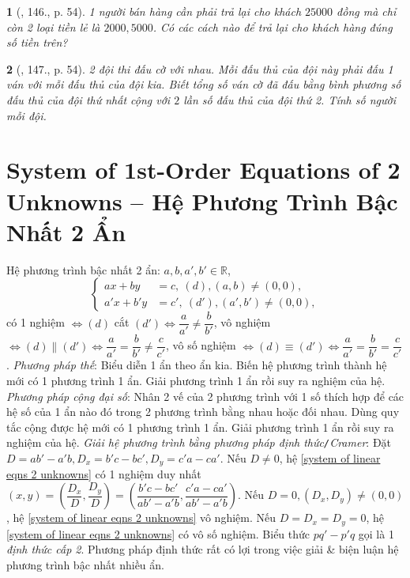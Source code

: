 \documentclass{article}
\newtheorem{baitoan}{}
\begin{document}
\begin{baitoan}[\cite{Tuyen_Toan_9_old}, 146., p. 54]
	1 người bán hàng cần phải trả lại cho khách $25000$ đồng mà chỉ còn 2 loại tiền lẻ là $2000,5000$. Có các cách nào để trả lại cho khách hàng đúng số tiền trên?
\end{baitoan}

\begin{baitoan}[\cite{Tuyen_Toan_9_old}, 147., p. 54]
	2 đội thi đấu cờ với nhau. Mỗi đấu thủ của đội này phải đấu 1 ván với mỗi đấu thủ của đội kia. Biết tổng số ván cờ đã đấu bằng bình phương số đấu thủ của đội thứ nhất cộng với $2$ lần số đấu thủ của đội thứ 2. Tính số người mỗi đội.
\end{baitoan}


\section{System of 1st-Order Equations of 2 Unknowns -- Hệ Phương Trình Bậc Nhất 2 Ẩn}
 Hệ phương trình bậc nhất 2 ẩn: $a,b,a',b'\in\mathbb{R}$,
\begin{equation}
	\label{system of linear eqns 2 unknowns}
	\left\{\begin{split}
		ax + by &= c,\ (d),(a,b)\ne(0,0),\\
		a'x + b'y &= c',\ (d'),(a',b')\ne(0,0),
	\end{split}\right.
\end{equation}
có 1 nghiệm $\Leftrightarrow(d)$ cắt $(d')\Leftrightarrow\dfrac{a}{a'}\ne\dfrac{b}{b'}$, vô nghiệm $\Leftrightarrow(d)\parallel(d')\Leftrightarrow\dfrac{a}{a'} = \dfrac{b}{b'}\ne\dfrac{c}{c'}$, vô số nghiệm $\Leftrightarrow(d)\equiv(d')\Leftrightarrow\dfrac{a}{a'} = \dfrac{b}{b'} = \dfrac{c}{c'}$.  \textit{Phương pháp thế}: Biểu diễn 1 ẩn theo ẩn kia. Biến hệ phương trình thành hệ mới có 1 phương trình 1 ẩn. Giải phương trình 1 ẩn rồi suy ra nghiệm của hệ.  \textit{Phương pháp cộng đại số}: Nhân 2 vế của 2 phương trình với 1 số thích hợp để các hệ số của 1 ẩn nào đó trong 2 phương trình bằng nhau hoặc đối nhau. Dùng quy tắc cộng được hệ mới có 1 phương trình 1 ẩn. Giải phương trình 1 ẩn rồi suy ra nghiệm của hệ.  \textit{Giải hệ phương trình bằng phương pháp định thức{\tt/}Cramer}: Đặt $D = ab' - a'b,D_x = b'c - bc',D_y = c'a - ca'$. Nếu $D\ne0$, hệ \eqref{system of linear eqns 2 unknowns} có 1 nghiệm duy nhất $(x,y) = \left(\dfrac{D_x}{D},\dfrac{D_y}{D}\right) = \left(\dfrac{b'c - bc'}{ab' - a'b},\dfrac{c'a - ca'}{ab' - a'b}\right)$. Nếu $D = 0,(D_x,D_y)\ne(0,0)$, hệ \eqref{system of linear eqns 2 unknowns} vô nghiệm. Nếu $D = D_x = D_y = 0$, hệ \eqref{system of linear eqns 2 unknowns} có vô số nghiệm. Biểu thức $pq' - p'q$ gọi là 1 \textit{định thức cấp 2}. Phương pháp định thức rất có lợi trong việc giải \& biện luận hệ phương trình bậc nhất nhiều ẩn.\\
\end{document}

